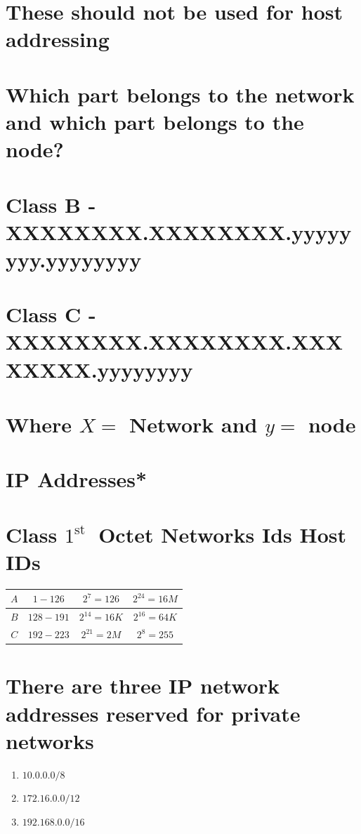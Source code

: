 \documentclass[10pt]{article}
\begin{document}
\section{These should not be used for host addressing}
\section*{Which part belongs to the network and which part belongs to the node? }

\section{Class B - XXXXXXXX.XXXXXXXX.yyyyyyyy.yyyyyyyy}
\section{Class C - XXXXXXXX.XXXXXXXX.XXXXXXXX.yyyyyyyy}
\section{Where $X=$ Network and $y=$ node}
\section{IP Addresses*}
\section{Class $1^{\text {st }}$ Octet Networks Ids Host IDs}
\begin{center}
\begin{tabular}{|c|c|c|c|}
\hline
$A$ & $1-126$ & $2^{7}=126$ & $2^{24}=16 M$ \\
\hline
$B$ & $128-191$ & $2^{14}=16 K$ & $2^{16}=64 K$ \\
\hline
$C$ & $192-223$ & $2^{21}=2 M$ & $2^{8}=255$ \\
\hline
\end{tabular}
\end{center}

\section{There are three IP network addresses reserved for private networks}
\begin{enumerate}
  \item $10.0 .0 .0 / 8$

  \item $172.16 .0 .0 / 12$

  \item $192.168 .0 .0 / 16$

\end{enumerate}
\end{document}
